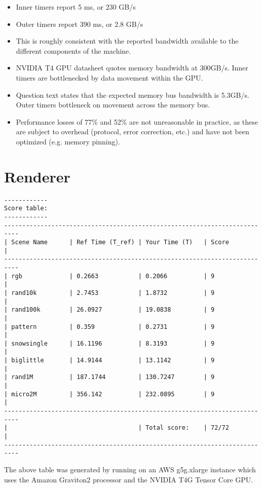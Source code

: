 \documentclass[11pt]{article}
\begin{document}
\begin{itemize}
  \item Inner timers report 5 ms, or 230 GB/s
  \item Outer timers report 390 ms, or 2.8 GB/s
  \item This is roughly consistent with the reported bandwidth available to the
    different components of the machine.
  \item NVIDIA T4 GPU datasheet quotes memory bandwidth at 300GB/s. Inner timers
    are bottlenecked by data movement within the GPU.
  \item Question text states that the expected memory bus bandwidth is 5.3GB/s.
    Outer timers bottleneck on movement across the memory bus.
  \item Performance losses of 77\% and 52\% are not unreasonable in practice, as
    these are subject to overhead (protocol, error correction, etc.) and have
    not been optimized (e.g. memory pinning).
\end{itemize}

\newpage
\section{Renderer}

\begin{lstlisting}
------------
Score table:
------------
--------------------------------------------------------------------------
| Scene Name      | Ref Time (T_ref) | Your Time (T)   | Score           |
--------------------------------------------------------------------------
| rgb             | 0.2663           | 0.2066          | 9               |
| rand10k         | 2.7453           | 1.8732          | 9               |
| rand100k        | 26.0927          | 19.0838         | 9               |
| pattern         | 0.359            | 0.2731          | 9               |
| snowsingle      | 16.1196          | 8.3193          | 9               |
| biglittle       | 14.9144          | 13.1142         | 9               |
| rand1M          | 187.1744         | 130.7247        | 9               |
| micro2M         | 356.142          | 232.0895        | 9               |
--------------------------------------------------------------------------
|                                    | Total score:    | 72/72           |
--------------------------------------------------------------------------
\end{lstlisting}

The above table was generated by running on an AWS g5g.xlarge instance which
uses the Amazon Graviton2 processor and the NVIDIA T4G Tensor Core GPU.
\end{document}
